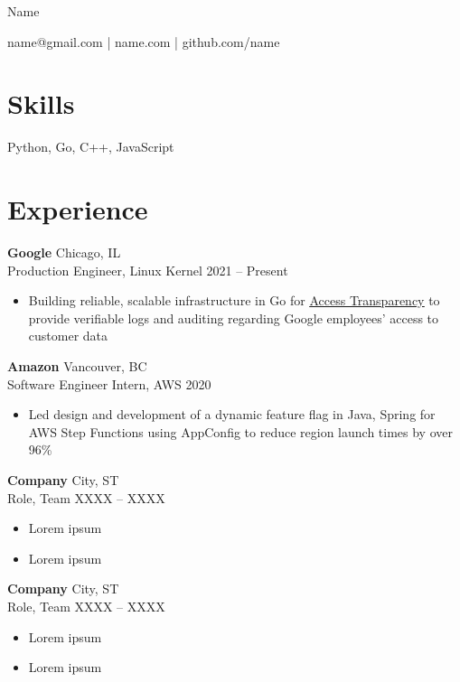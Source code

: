 \documentclass[11pt,letterpaper]{article}
\begin{document}
\centerline{\Huge Name}
\centerline{name@gmail.com | name.com | github.com/name}

\section*{Skills}
Python, Go, C++, JavaScript

\vspace{-4.5pt}

\section*{Experience}
\textbf{Google} \hfill Chicago, IL \\
Production Engineer, Linux Kernel \hfill 2021 -- Present \\
\vspace{-10pt}
\begin{itemize}
  \item Building reliable, scalable infrastructure in Go for \href{https://cloud.google.com/access-transparency}{\underline{Access Transparency}} to provide verifiable logs and auditing regarding Google employees’ access to customer data
\end{itemize}

\textbf{Amazon} \hfill Vancouver, BC \\
Software Engineer Intern, AWS \hfill 2020 \\
\vspace{-10pt}
\begin{itemize}
  \item Led design and development of a dynamic feature flag in Java, Spring for AWS Step Functions using AppConfig to reduce region launch times by over 96\%
\end{itemize}

\textbf{Company} \hfill City, ST \\
Role, Team \hfill XXXX -- XXXX \\
\vspace{-10pt}
\begin{itemize}
  \item Lorem ipsum
  \item Lorem ipsum
\end{itemize}

\textbf{Company} \hfill City, ST \\
Role, Team \hfill XXXX -- XXXX \\
\vspace{-10pt}
\begin{itemize}
  \item Lorem ipsum
  \item Lorem ipsum
\end{itemize}
\end{document}
